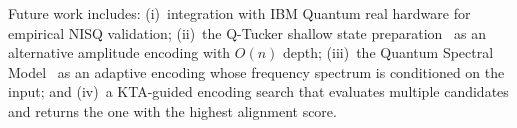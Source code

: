 \documentclass[sigconf,nonacm]{acmart}
\begin{document}
Future work includes: (i)~integration with IBM Quantum real hardware for empirical
NISQ validation; (ii)~the Q-Tucker shallow state preparation~\cite{qtuckerarxiv}
as an alternative amplitude encoding with $O(n)$ depth; (iii)~the Quantum Spectral
Model~\cite{qsmarxiv} as an adaptive encoding whose frequency spectrum is
conditioned on the input; and (iv)~a KTA-guided encoding search that evaluates
multiple candidates and returns the one with the highest alignment score.



\end{document}
